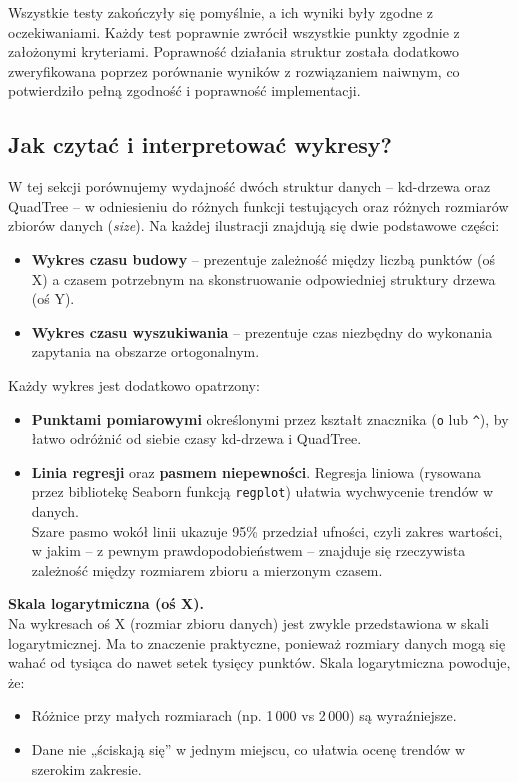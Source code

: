 \documentclass[12pt]{article}
\begin{document}
\noindent Wszystkie testy zakończyły się pomyślnie, a ich wyniki były zgodne z oczekiwaniami. Każdy test poprawnie zwrócił wszystkie punkty zgodnie z założonymi kryteriami. Poprawność działania struktur została dodatkowo zweryfikowana poprzez porównanie wyników z rozwiązaniem naiwnym, co potwierdziło pełną zgodność i poprawność implementacji. 

\newpage
\subsection{Jak czytać i interpretować wykresy?}
\label{sec:interpretacja_wykresow}

W tej sekcji porównujemy wydajność dwóch struktur danych -- kd-drzewa oraz QuadTree -- w odniesieniu do różnych funkcji testujących oraz różnych rozmiarów zbiorów danych (\textit{size}). Na każdej ilustracji znajdują się dwie podstawowe części:

\begin{itemize}
    \item \textbf{Wykres czasu budowy} -- prezentuje zależność między liczbą punktów (oś X) a czasem potrzebnym na skonstruowanie odpowiedniej struktury drzewa (oś Y).
    \item \textbf{Wykres czasu wyszukiwania} -- prezentuje czas niezbędny do wykonania zapytania na obszarze ortogonalnym.
\end{itemize}

Każdy wykres jest dodatkowo opatrzony:

\begin{itemize}
    \item \textbf{Punktami pomiarowymi} określonymi przez kształt znacznika (\texttt{o} lub \texttt{\^{}}), by łatwo odróżnić od siebie czasy kd-drzewa i QuadTree.
    \item \textbf{Linia regresji} oraz \textbf{pasmem niepewności}. Regresja liniowa (rysowana przez bibliotekę Seaborn funkcją \texttt{regplot}) ułatwia wychwycenie trendów w danych. \\
    Szare pasmo wokół linii ukazuje 95\% przedział ufności, czyli zakres wartości, w jakim – z pewnym prawdopodobieństwem – znajduje się rzeczywista zależność między rozmiarem zbioru a mierzonym czasem.
\end{itemize}

\noindent
\textbf{Skala logarytmiczna (oś X).} \\
Na wykresach oś X (rozmiar zbioru danych) jest zwykle przedstawiona w skali logarytmicznej. Ma to znaczenie praktyczne, ponieważ rozmiary danych mogą się wahać od tysiąca do nawet setek tysięcy punktów. Skala logarytmiczna powoduje, że:
\begin{itemize}
    \item Różnice przy małych rozmiarach (np. 1\,000 vs 2\,000) są wyraźniejsze.
    \item Dane nie „ściskają się” w jednym miejscu, co ułatwia ocenę trendów w szerokim zakresie.
\end{itemize}
\end{document}
